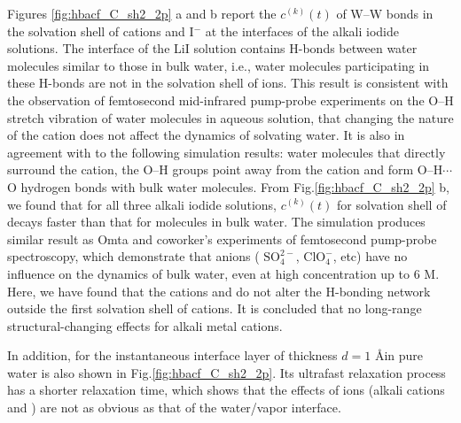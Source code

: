 Figures \thinspace\ref{fig:hbacf_C_sh2_2p} a and b 
report the  $c^{(k)}(t)$ of W--W bonds in the solvation shell of cations and I$^-$ at the interfaces of the alkali iodide solutions.
The interface of the LiI solution contains H-bonds between water molecules similar to those in bulk water, i.e.,
water molecules participating in these H-bonds are not in the solvation shell of ions. 
This result is consistent with the observation of femtosecond mid-infrared pump-probe experiments 
on the O--H stretch vibration of water molecules in aqueous solution,
that changing the nature of the cation does not affect the dynamics of solvating water\cite{Kropman2001}.
It is also in agreement with to the following \abinitio simulation results: water molecules that directly surround the cation, the O--H groups point
away from the cation and form O--H$\cdots$O hydrogen bonds with bulk water molecules\cite{Hashimoto1994,Ramaniah1998,Kropman2001}.
From Fig.\thinspace\ref{fig:hbacf_C_sh2_2p} b, we found that for all three alkali iodide solutions, $c^{(k)}(t)$ for solvation shell  
of \I decays faster than that for molecules in bulk water.
The simulation produces similar result as Omta and coworker's experiments of femtosecond pump-probe spectroscopy,
which demonstrate that anions ( $\text{SO}^{2-}_4$, $\text{ClO}^-_4$, etc) have no influence on the dynamics of bulk water, 
even at high concentration up to 6 M\cite{Omta2003, ZhangYanjie2006}. 
Here, we have found that the cations \Li and \Na do not alter the H-bonding network outside the first solvation shell of cations. 
It is concluded that no long-range structural-changing effects for alkali metal cations.

In addition, \CHB for the instantaneous interface layer of thickness $d=1$ \AA in pure water is also shown in Fig.\thinspace\ref{fig:hbacf_C_sh2_2p}.
Its ultrafast relaxation process has a shorter relaxation time, which shows that the effects of ions (alkali cations and \I) are not as obvious as that of the water/vapor interface.


